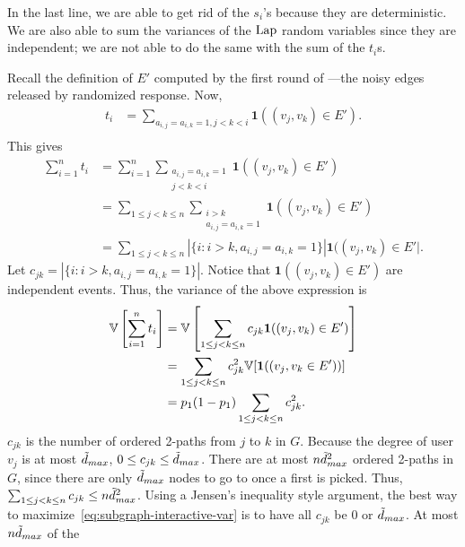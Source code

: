 {  In the last line, we are able to get rid of the $s_i$'s because they are
  deterministic. We are also able to sum the variances of the $\textrm{Lap}$ random
  variables since they are independent; we are not able to do the same with the
  sum of the $t_i$s. 

  Recall the definition of $E'$ computed by the first round of
  ---the noisy edges released by randomized
  response. Now,
  \begin{align*}
    t_i &= \sum_{a_{i,j}=a_{i,k}=1, j<k<i} \textbf{1}((v_j,v_k) \in E'). \\
  \end{align*}
  This gives
  \begin{align*}
    \sum_{i=1}^n t_i &= \sum_{i=1}^n\sum_{\substack{a_{i,j}=a_{i,k}=1 \\ j<k<i }} \textbf{1}((v_j,v_k) \in
    E') \\
    &= \sum_{1 \leq j < k \leq n} \sum_{\substack{i > k \\ a_{i,j}=a_{i,k}=1
    }} \textbf{1}((v_j,v_k) \in E') \\
    &= \sum_{1 \leq j < k \leq n} |\{i : i>k, a_{i,j}=a_{i,k}=1\}| \textbf{1}((v_j,v_k)
    \in E'|.
  \end{align*}
  Let $c_{jk} = |\{i : i>k, a_{i,j}=a_{i,k}=1\}|$. Notice that $\textbf{1}( (v_j,v_k) \in E')$
  are independent events. Thus, the variance of the above expression is
  \begin{align}
    \mathbb{V}\left[\sum_{i=1}^n t_i\right] &= 
    \mathbb{V}
    \left[\sum_{1 \leq j < k \leq n}
    c_{jk} \textbf{1}( (v_j,v_k) \in E') \right] \nonumber \\
    &= \sum_{1 \leq j < k \leq n} c_{jk}^2 \mathbb{V}[\textbf{1}( (v_j,v_k \in E')) ]
    \nonumber \\
    &= p_1 (1-p_1) \sum_{1 \leq j < k \leq n} c_{jk}^2.
    \label{eq:subgraph-interactive-var}
  \end{align}
  $c_{jk}$ is the number of ordered 2-paths from $j$ to $k$ in $G$. Because 
  the degree of user $v_j$ is at most $\tilde{d}_{max}$, 
  $0 \leq c_{jk} \leq \tilde{d}_{max}$. There are at most
  $n\tilde{d}_{max}^2$ ordered
  2-paths in $G$, since there are only $\tilde{d}_{max}$ 
  nodes 
  to go to once a first is
  picked. Thus, $\sum_{1 \leq j < k \leq n} c_{jk} \leq n\tilde{d}_{max}^2$. Using a Jensen's inequality
  style argument, the best way to maximize~\eqref{eq:subgraph-interactive-var} is to have
  all $c_{jk}$ be $0$ or $\tilde{d}_{max}$. At most $n\tilde{d}_{max}$ of the 
}

